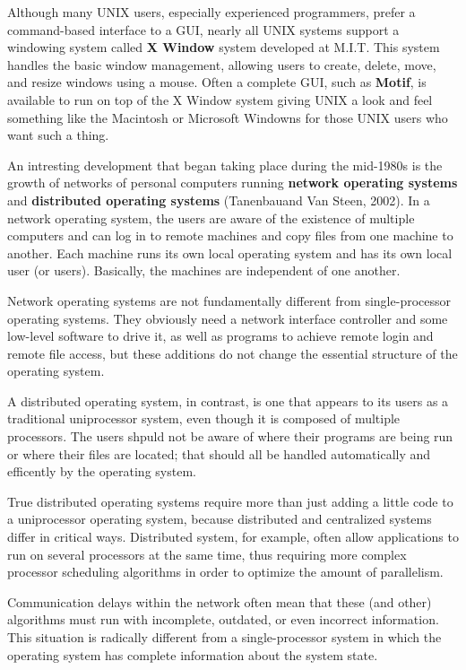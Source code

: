 \documentclass{book}
\newcommand {\kw}  [1] {\textbf{#1}}
\begin{document}
Although many UNIX users, especially experienced programmers, prefer a command-based interface to a GUI, 
nearly all UNIX systems support a windowing system called \kw{X Window} system developed at M.I.T.
This system handles the basic window management, allowing users to create, delete, move, and resize windows using a mouse.
Often a complete GUI, such as \kw{Motif}, is available to run on top of the X Window system 
giving UNIX a look and feel something like the Macintosh or Microsoft Windowns for those UNIX users who want such a thing.

An intresting development that began taking place during the mid-1980s is the growth of 
networks of personal computers running \kw{network operating systems} and \kw{distributed operating systems} (Tanenbauand Van Steen, 2002).
In a network operating system, the users are aware of the existence of multiple computers 
and can log in to remote machines and copy files from one machine to another.
Each machine runs its own local operating system and has its own local user (or users).
Basically, the machines are independent of one another.

Network operating systems are not fundamentally different from single-processor operating systems.
They obviously need a network interface controller and some low-level software to drive it, 
as well as programs to achieve remote login and remote file access, 
but these additions do not change the essential structure of the operating system.

A distributed operating system, in contrast, is one that appears to its users as a traditional uniprocessor system, 
even though it is composed of multiple processors.
The users shpuld not be aware of where their programs are being run or where their files are located;
that should all be handled automatically and efficently by the operating system.

True distributed operating systems require more than just adding a little code to a uniprocessor operating system, 
because distributed and centralized systems differ in critical ways.
Distributed system, for example, often allow applications to run on several processors at the same time, 
thus requiring more complex processor scheduling algorithms in order to optimize the amount of parallelism.

Communication delays within the network often mean that these (and other) algorithms must run with incomplete, outdated, or even incorrect information.
This situation is radically different from a single-processor system in which the operating system has complete information about the system state.
\end{document}
